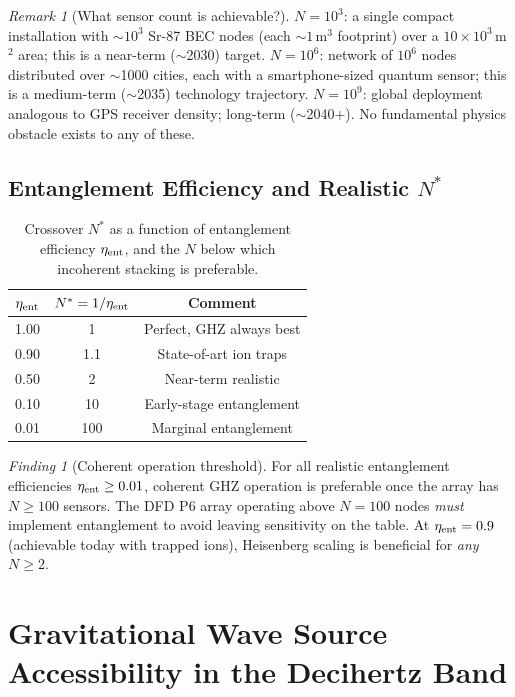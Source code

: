 \documentclass[11pt]{article}
\theoremstyle{definition}
\theoremstyle{remark}
\newtheorem{remark}[theorem]{Remark}
\newtheorem{finding}[theorem]{Finding}
\newcommand{\ee}[1]{\times10^{#1}}
\begin{document}
\begin{remark}[What sensor count is achievable?]
$N=10^3$: a single compact installation with $\sim 10^3$ Sr-87 BEC
nodes (each $\sim 1$\,m$^3$ footprint) over a $10\ee{3}$\,m$^2$ area;
this is a near-term ($\sim$2030) target.
$N=10^6$: network of $10^6$ nodes distributed over $\sim$1000 cities,
each with a smartphone-sized quantum sensor; this is a medium-term
($\sim$2035) technology trajectory.
$N=10^9$: global deployment analogous to GPS receiver density; long-term
($\sim$2040+).  No fundamental physics obstacle exists to any of these.
\end{remark}

\subsection{Entanglement Efficiency and Realistic $N^*$}

\begin{table}[h]
\centering
\caption{Crossover $N^*$ as a function of entanglement efficiency $\eta_{\rm ent}$,
and the $N$ below which incoherent stacking is preferable.}
\label{tab:crossover}
\begin{tabular}{@{}ccc@{}}
\toprule
$\eta_{\rm ent}$ & $N^* = 1/\eta_{\rm ent}$ & Comment \\
\midrule
1.00 & 1   & Perfect, GHZ always best \\
0.90 & 1.1 & State-of-art ion traps \\
0.50 & 2   & Near-term realistic \\
0.10 & 10  & Early-stage entanglement \\
0.01 & 100 & Marginal entanglement \\
\bottomrule
\end{tabular}
\end{table}

\begin{finding}[Coherent operation threshold]
For all realistic entanglement efficiencies $\eta_{\rm ent} \geq 0.01$,
coherent GHZ operation is preferable once the array has $N \geq 100$ sensors.
The DFD P6 array operating above $N=100$ nodes \emph{must} implement
entanglement to avoid leaving sensitivity on the table.  At
$\eta_{\rm ent} = 0.9$ (achievable today with trapped ions),
Heisenberg scaling is beneficial for \emph{any} $N \geq 2$.
\end{finding}

\section{Gravitational Wave Source Accessibility in the Decihertz Band}
\label{sec:gw-sources}
\end{document}
